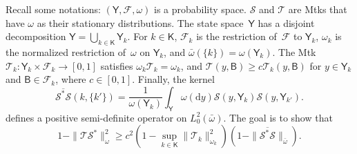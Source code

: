 \documentclass[12pt]{article}
\newcommand{\df}{\mathrm{d}}
\newcommand{\Y}{\mathsf{Y}}
\newcommand{\F}{\mathcal{F}}
\newcommand{\Mtk}{\mtkfont{T}}
\newcommand{\mtkfont}{\mathcal}
\begin{document}
Recall some notations: 
$(\Y,\F,\omega)$ is a probability space.
$\mtkfont{S}$ and $\Mtk$ are Mtks that have $\omega$ as their stationary distributions.
The state space~$\Y$ has a disjoint decomposition $\Y = \bigcup_{k \in \mathsf{K}} \Y_k$.
For $k \in \mathsf{K}$, $\F_k$ is the restriction of~$\F$ to $\Y_k$, $\omega_k$ is the normalized restriction of~$\omega$ on $\Y_k$, and $\bar{\omega}(\{k\}) = \omega(\Y_k)$.
The Mtk $\Mtk_k: \Y_k \times \F_k \to [0,1]$ satisfies $\omega_k \Mtk_k = \omega_k$, and $\Mtk(y,\mathsf{B}) \geq c\Mtk_k(y, \mathsf{B})$ for $y \in \Y_k$ and $\mathsf{B} \in \F_k$, where $c \in [0,1]$.
Finally, the kernel
\[
\overline{\mtkfont{S}^* \mtkfont{S}}(k,\{k'\}) = \frac{1}{\omega(\Y_k)} \int_{\Y} \omega(\df y) \mtkfont{S}(y, \Y_k) \mtkfont{S}(y, \Y_{k'}).
\]
defines a positive semi-definite operator on $L_0^2(\bar{\omega})$.
The goal is to show that
\[
1 - \|\Mtk \mtkfont{S}^*\|_{\omega}^2 \geq c^2 \left(1 - \sup_{k \in \mathsf{K}} \|\Mtk_k\|_{\omega_k}^2 \right) (1 - \|\overline{\mtkfont{S}^* \mtkfont{S}}\|_{\bar{\omega}} ).
\]
\end{document}
